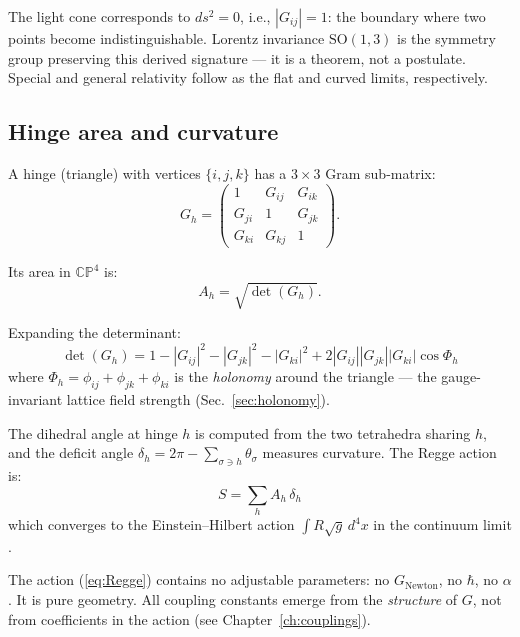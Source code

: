 \begin{remark}
The light cone corresponds to $ds^2 = 0$, i.e., $|G_{ij}| = 1$: the boundary where two points become indistinguishable. Lorentz invariance $\text{SO}(1,3)$ is the symmetry group preserving this derived signature --- it is a theorem, not a postulate. Special and general relativity follow as the flat and curved limits, respectively.
\end{remark}

\subsection{Hinge area and curvature}

A hinge (triangle) with vertices $\{i, j, k\}$ has a $3\times 3$ Gram sub-matrix:
\begin{equation}
G_h = \begin{pmatrix} 1 & G_{ij} & G_{ik} \\ G_{ji} & 1 & G_{jk} \\ G_{ki} & G_{kj} & 1 \end{pmatrix}.
\end{equation}

Its area in $\mathbb{CP}^4$ is:
\begin{equation}
A_h = \sqrt{\det(G_h)}.
\end{equation}

Expanding the determinant:
\begin{equation}
\det(G_h) = 1 - |G_{ij}|^2 - |G_{jk}|^2 - |G_{ki}|^2 + 2|G_{ij}||G_{jk}||G_{ki}|\cos\Phi_h
\label{eq:detGh}
\end{equation}
where $\Phi_h = \phi_{ij} + \phi_{jk} + \phi_{ki}$ is the \emph{holonomy} around the triangle --- the gauge-invariant lattice field strength (Sec.~\ref{sec:holonomy}).

The dihedral angle at hinge $h$ is computed from the two tetrahedra sharing $h$, and the deficit angle $\delta_h = 2\pi - \sum_{\sigma \ni h} \theta_\sigma$ measures curvature. The Regge action is:
\begin{equation}
\boxed{S = \sum_h A_h\,\delta_h}
\label{eq:Regge}
\end{equation}
which converges to the Einstein--Hilbert action $\int R\sqrt{g}\,d^4x$ in the continuum limit \cite{Regge}.

\begin{remark}
The action (\ref{eq:Regge}) contains no adjustable parameters: no $G_\text{Newton}$, no $\hbar$, no $\alpha$. It is pure geometry. All coupling constants emerge from the \emph{structure} of $G$, not from coefficients in the action (see Chapter~\ref{ch:couplings}).
\end{remark}

